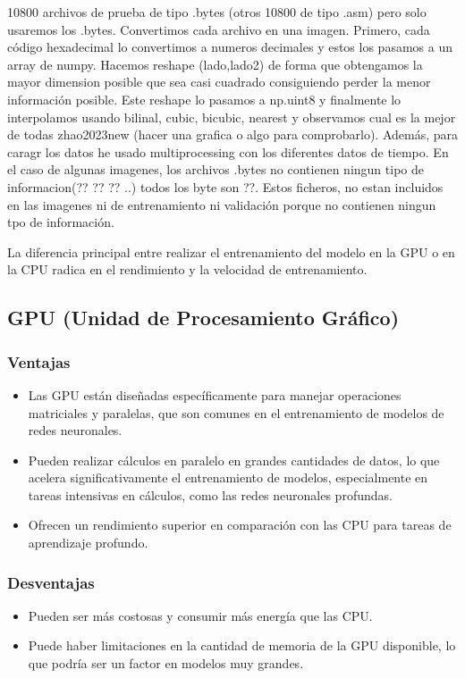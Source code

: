 10800 archivos de prueba de tipo .bytes (otros 10800 de tipo .asm) pero solo usaremos los .bytes. Convertimos cada archivo en una imagen. Primero, cada código hexadecimal lo convertimos a numeros decimales y estos los pasamos a un array de numpy. Hacemos reshape (lado,lado2) de forma que obtengamos la mayor dimension posible que sea casi cuadrado consiguiendo perder la menor información posible. Este reshape lo pasamos a np.uint8 y finalmente lo interpolamos usando bilinal, cubic, bicubic, nearest y observamos cual es la mejor de todas {zhao2023new} (hacer una grafica o algo para comprobarlo). Además, para caragr los datos he usado multiprocessing con los diferentes datos de tiempo. En el caso de algunas imagenes, los archivos .bytes no contienen ningun tipo de informacion(?? ?? ?? ..) todos los byte son ??. Estos ficheros, no estan incluidos en las imagenes ni de entrenamiento ni validación porque no contienen ningun tpo de información. 

La diferencia principal entre realizar el entrenamiento del modelo en la GPU o en la CPU radica en el rendimiento y la velocidad de entrenamiento.

\subsection{GPU (Unidad de Procesamiento Gráfico)}

\subsubsection{Ventajas}
\begin{itemize}
    \item Las GPU están diseñadas específicamente para manejar operaciones matriciales y paralelas, que son comunes en el entrenamiento de modelos de redes neuronales.
    \item Pueden realizar cálculos en paralelo en grandes cantidades de datos, lo que acelera significativamente el entrenamiento de modelos, especialmente en tareas intensivas en cálculos, como las redes neuronales profundas.
    \item Ofrecen un rendimiento superior en comparación con las CPU para tareas de aprendizaje profundo.
\end{itemize}

\subsubsection{Desventajas}
\begin{itemize}
    \item Pueden ser más costosas y consumir más energía que las CPU.
    \item Puede haber limitaciones en la cantidad de memoria de la GPU disponible, lo que podría ser un factor en modelos muy grandes.
\end{itemize}

